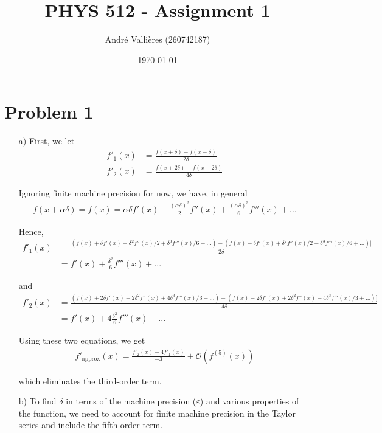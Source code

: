 \documentclass{article}
\title{PHYS 512 - Assignment 1}
\author{André Vallières (260742187)}
\date{\today}
\begin{document}
\maketitle

\section*{Problem 1}
\begin{itemize}
    \item[a) ] First, we let
    \begin{align*}
        f'_1 (x) &= \frac{f(x + \delta) - f(x - \delta)}{2\delta} \\
        f'_2 (x) &= \frac{f(x + 2\delta) - f(x - 2\delta)}{4\delta}
    \end{align*}
    
    Ignoring finite machine precision for now, we have, in general
    \begin{align*}
        f(x + \alpha \delta) = f(x) = \alpha \delta f'(x) + \frac{(\alpha \delta)^2}{2} f''(x) + \frac{(\alpha \delta)^3}{6} f'''(x) + ...
    \end{align*}
    
    Hence, 
    \begin{align*}
        f'_1 (x) &= \frac{(f(x) + \delta f'(x) + \delta^2 f''(x) / 2 + \delta^3 f'''(x) / 6 + ...) - (f(x) - \delta f'(x) + \delta^2 f''(x) / 2 - \delta^3 f'''(x) / 6 + ...) \Big]}{2\delta} \\
        &= f'(x) + \frac{\delta^2}{6} f'''(x) + ...
    \end{align*}
    
    and
    \begin{align*}
        f'_2 (x) &= \frac{(f(x) + 2\delta f'(x) + 2 \delta^2 f''(x) + 4 \delta^3 f'''(x) / 3 + ...) - (f(x) - 2 \delta f'(x) + 2 \delta^2 f''(x) - 4 \delta^3 f'''(x) / 3 + ...) \Big]}{4\delta} \\
        &= f'(x) + 4 \frac{\delta^2}{6} f'''(x) + ...
    \end{align*}
    
    Using these two equations, we get
    \begin{align}
        \label{eq:sol-1a}
        f'_{\text{approx}}(x) = \frac{f'_2(x) - 4f'_1(x)}{-3} + \mathcal{O}(f^{(5)}(x))
    \end{align}
    
    which eliminates the third-order term.
    
    \item[b)] To find $\delta$ in terms of the machine precision ($\varepsilon$) and various properties of the function, we need to account for finite machine precision in the Taylor series and include the fifth-order term.
    

\end{itemize}
\end{document}
